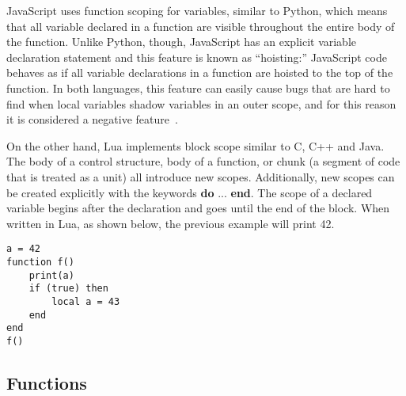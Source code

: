 JavaScript uses function scoping for variables, similar to Python, which means that all 
variable declared in a function are visible throughout the entire body of the function.
Unlike Python, though, JavaScript has an explicit variable declaration statement and
this feature is known as ``hoisting:'' JavaScript code behaves as if all 
variable declarations in a function are hoisted to the top of the function. In both
languages, this feature can easily cause bugs that are hard to find when local variables
shadow variables in an outer scope, and for this reason it is considered a negative 
feature~\cite{goodparts}.


On the other hand, Lua implements block scope similar to C, C++ and Java.
The body of a control structure, body of a function, or chunk (a segment of
code that is treated as a unit) all introduce new scopes. Additionally,
new scopes can be created explicitly with the keywords \textbf{do} ... \textbf{end}.
The scope of a declared variable begins after the declaration and goes until the
end of the block. When written in Lua, as shown below, the previous example
will print 42. 

\begin{lstlisting}[language={[5.2]Lua},caption=A demonstration of block scope in Lua.]
a = 42
function f()
	print(a)
    if (true) then
        local a = 43
    end
end
f()
\end{lstlisting}

\subsection{Functions}
\label{functions}



